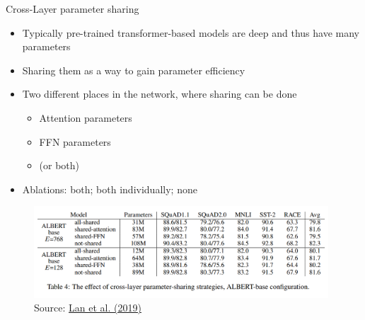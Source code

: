 
\begin{frame}{Cross-Layer parameter sharing}

\vfill

	\begin{itemize}
		\item Typically pre-trained transformer-based models are deep and thus have many parameters
		\item Sharing them as a way to gain parameter efficiency
		\item Two different places in the network, where sharing can be done
			\begin{itemize}
				\item Attention parameters
				\item FFN parameters
				\item (or both)
			\end{itemize}
		\item Ablations: both; both individually; none
	\end{itemize}

	\begin{figure}
		\centering
		\includegraphics[width = 11cm]{figure/albert-param-sharing.png}\\ 
		\footnotesize{Source:} \href{https://arxiv.org/pdf/1909.11942.pdf}{\footnotesize Lan et al. (2019)}
	\end{figure}

\vfill

\end{frame}



